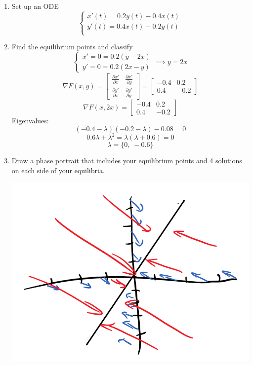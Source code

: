 \documentclass[12pt]{article}
\begin{document}
\begin{enumerate}
    \item Set up an ODE 
    \[\begin{cases}
        x'(t) = 0.2y(t) - 0.4x(t)\\
        y'(t) = 0.4x(t) - 0.2y(t)\\
    \end{cases}\]

    \item Find the equilibrium points and classify 
    \[\begin{cases}
        x' = 0 = 0.2 (y - 2x)\\
        y' = 0 = 0.2 (2x - y)
    \end{cases} \implies y = 2x\]
    \[\nabla F(x, y) = \begin{bmatrix}
        \frac{\partial x'}{\partial x} & \frac{\partial x'}{\partial y}\\
        \frac{\partial y'}{\partial x} & \frac{\partial y'}{\partial y}
    \end{bmatrix} = \begin{bmatrix}
        -0.4 & 0.2\\
        0.4 & -0.2
    \end{bmatrix}\]
    \[\nabla F(x, 2x) = \begin{bmatrix}
        -0.4 & 0.2\\
        0.4 & -0.2
    \end{bmatrix}\]
    Eigenvalues:
    \[(-0.4 - \lambda)(-0.2 - \lambda) - 0.08 = 0\]
    \[0.6\lambda + \lambda^2 = \lambda(\lambda + 0.6) = 0\]
    \[\lambda = \{0, \; -0.6\}\]

    \pagebreak 

    \item Draw a phase portrait that includes your equilibrium points and 4 solutions on each side of your equilibria. 
    
    \includegraphics{Images/p2 solutions.png}


\end{enumerate}
\end{document}
